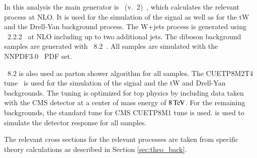 In this analysis the main generator is \Powheg~(v.~2)~\cite{bib:powheg2,Frixione:2007vw,Nason:2004rx}, which calculates the relevant process at NLO. 
It is used for the simulation of the \ttbar signal \cite{Frixione:2007nw} as well as for the tW \cite{Re:2010bp} and the Drell-Yan \cite{Kardos:2014dua,Alioli:2010qp} background process.
The W+jets process is generated using \MGaMCatNLO~2.2.2~\cite{Alwall:2014hca,Frederix:2012ps} at NLO including up to two additional jets. The diboson background samples are generated with \Pythia~8.2~\cite{Sjostrand:2014zea}.
All samples are simulated with the NNPDF3.0~\cite{Ball:2012cx} PDF set.

\Pythia~8.2 is also used as parton shower algorithm for all samples. The CUETP8M2T4 tune~\cite{CMS-PAS-TOP-16-021,Skands:2014pea} is used for the simulation of the signal and the tW and Drell-Yan backgrounds.
The tuning is optimized for top physics by including \ttbar data taken with the CMS detector at a center of mass energy of $8 \,\text{Te\hspace{-.08em}V}$.
For the remaining backgrounds, the standard tune for CMS CUETP8M1 tune is used.
 \cite{geant} is used to simulate the detector response for all samples.

The relevant cross sections for the relevant processes are taken from specific theory calculations as described in Section \ref{sec:theo_back}.



